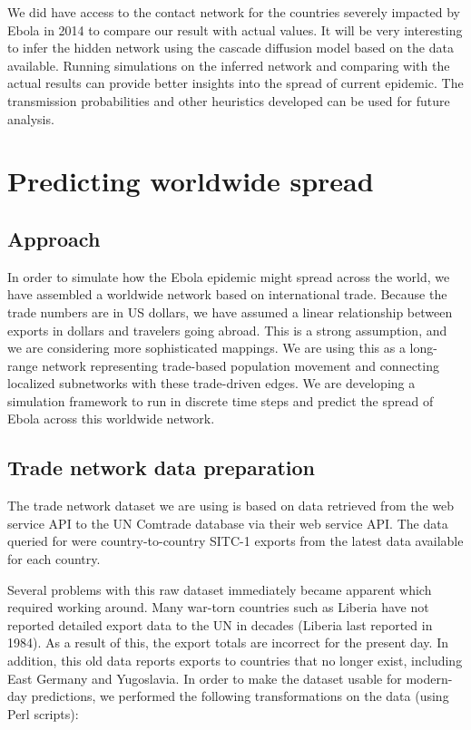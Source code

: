 \documentclass[10pt, journal,onecolumn]{IEEEtran}
\begin{document}
We did have access to the  contact network for the countries  severely impacted by Ebola in 2014 to compare our result with actual values.  It will be  very interesting to infer the hidden network using the cascade diffusion model based on the data available. Running simulations on  the inferred network and comparing  with the actual results can provide better insights into the spread of  current epidemic. The transmission probabilities and other heuristics developed can be used for future analysis.




\section{Predicting worldwide spread}
\label{sec:Worldwide}

\subsection*{\textbf{Approach}}
In order to simulate how the Ebola epidemic might spread across the world, we have assembled a
worldwide network based on international trade. Because the trade numbers are in US dollars,
we have assumed a linear relationship between exports in dollars and travelers going abroad.
This is a strong assumption, and we are considering more sophisticated mappings.
We are using this as a long-range network representing trade-based population movement and
connecting localized subnetworks with these trade-driven edges. We are developing a simulation
framework to run in discrete time steps and predict the spread of Ebola across this worldwide network.

\subsection*{\textbf{Trade network data preparation}}

The trade network dataset we are using is based on data retrieved from the web service API to the
UN Comtrade database \citep{uncomtradedata} via their web service API.
The data queried for were country-to-country SITC-1 exports from the latest data available
for each country.

Several problems with this raw dataset immediately became apparent which required working around.
Many war-torn countries such as Liberia have not reported detailed export data
to the UN in decades (Liberia last reported in 1984). As a result of this, the export totals
are incorrect for the present day. In addition, this old data reports exports to countries that
no longer exist, including East Germany and Yugoslavia. In order to make the dataset usable for
modern-day predictions, we performed the following transformations on the data (using Perl scripts):
\end{document}
